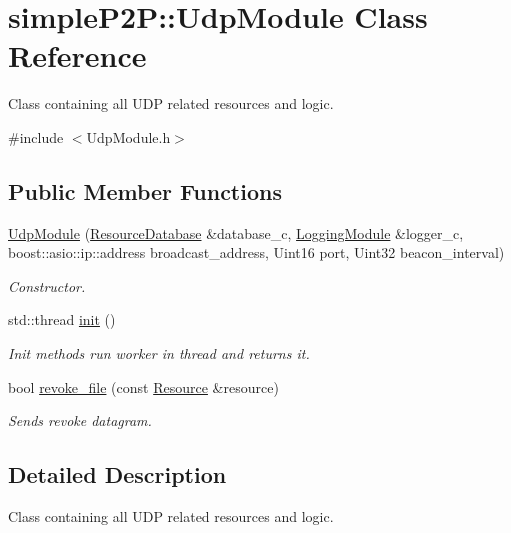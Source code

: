 \hypertarget{classsimpleP2P_1_1UdpModule}{}\section{simple\+P2P\+:\+:Udp\+Module Class Reference}
\label{classsimpleP2P_1_1UdpModule}


Class containing all U\+DP related resources and logic.  




{\ttfamily \#include $<$Udp\+Module.\+h$>$}

\subsection*{Public Member Functions}
\begin{DoxyCompactItemize}
\item 
\hyperlink{classsimpleP2P_1_1UdpModule_a05de956f448698b1f5acb1377dacd50c}{Udp\+Module} (\hyperlink{classsimpleP2P_1_1ResourceDatabase}{Resource\+Database} \&database\+\_\+c, \hyperlink{classsimpleP2P_1_1LoggingModule}{Logging\+Module} \&logger\+\_\+c, boost\+::asio\+::ip\+::address broadcast\+\_\+address, Uint16 port, Uint32 beacon\+\_\+interval)
\begin{DoxyCompactList}\small\item\em Constructor. \end{DoxyCompactList}\item 
std\+::thread \hyperlink{classsimpleP2P_1_1UdpModule_ac5602c9d0eaf0969dda8c71e5189827f}{init} ()
\begin{DoxyCompactList}\small\item\em Init methods run worker in thread and returns it. \end{DoxyCompactList}\item 
bool \hyperlink{classsimpleP2P_1_1UdpModule_a087b1b9aa9c20724df4856d43a90e031}{revoke\+\_\+file} (const \hyperlink{classsimpleP2P_1_1Resource}{Resource} \&resource)
\begin{DoxyCompactList}\small\item\em Sends revoke datagram. \end{DoxyCompactList}\end{DoxyCompactItemize}


\subsection{Detailed Description}
Class containing all U\+DP related resources and logic. 

